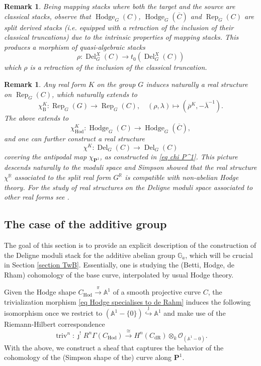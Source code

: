 \documentclass[11pt, a4paper]{amsart}
\numberwithin{equation}{section}
\newtheorem{remark}[theorem]{Remark}
\theoremstyle{definition}
\theoremstyle{remark}
\DeclareMathOperator{\Rep}{Rep}
\DeclareMathOperator{\Hodge}{Hodge}
\DeclareMathOperator{\Deligne}{Del}
\DeclareMathOperator{\triv}{triv}
\DeclareMathOperator{\dR}{dR}
\DeclareMathOperator{\Hod}{Hod}
\DeclareMathOperator{\Del}{Del}
\newcommand{\Oo}{\mathcal{O}}
\newcommand{\B}{\mathrm{B}}
\renewcommand{\P}{\mathbf{P}}
\newcommand{\ol}[1]{\overline{#1}}
\renewcommand{\AA}{\mathbb{A}}
\newcommand{\GG}{\mathbb{G}}
\newcommand{\RR}{\mathbb{R}}
\renewcommand{\to}{\longrightarrow}
\begin{document}
\begin{remark} \label{rm Del is split}
Being mapping stacks where both the target and the source are classical stacks, observe that $\Hodge_{G}(C)$, $\Hodge_{G}(\ol C)$ and $\Rep_{G}(C)$ are split derived stacks ({\emph i.e.} equipped with a retraction of the inclusion of their classical truncations) due to the intrinsic properties of mapping stacks. This produces a morphism of quasi-algebraic stacks 
\[
\rho : \Deligne_{G}^{X}(C) \to t_0 \left ( \Deligne_{G}^{X}(C) \right )
\]
which $\rho$ is a retraction of the inclusion of the classical truncation.
\end{remark}


\begin{remark} \label{rm real form on Deligne}
Any real form $K$ on the group $G$ induces naturally a real structure on $\Rep_G(C)$, which naturally extends to 
\[
\chi^K_{\B} : \Rep_G(G) \to \Rep_G(C), \quad (\rho, \lambda) \mapsto (\ol \rho^K, -\ol\lambda^{-1} ).
\]
The above extends to 
\[
\chi^K_{\Hod} : \Hodge_{G}(C) \to \Hodge_G(\ol C),
\]
and one can further construct a real structure 
\[
\chi^K : \Del_{G}(C) \to \Del_{G}(C)
\]
covering the antipodal map $\chi_{\P^1}$, as constructed in \eqref{eq chi P^1}. This picture descends naturally to the moduli space and Simpson showed \cite{simpson_hodge} that the real structure $\chi^{\RR}$ associated to the split real form $G^\RR$ is compatible with non-abelian Hodge theory. For the study of real structures on the Deligne moduli space associated to other real forms see \cite{biswas&heller&roser}. 
\end{remark}


\subsection{The case of the additive group}

The goal of this section is to provide an explicit description of the construction of the Deligne moduli stack for the additive abelian group $\GG_a$, which will be crucial in Section \ref{section TwB}. Essentially, one is studying the (Betti, Hodge, de Rham) cohomology of the base curve, interpolated by usual Hodge theory.

Given the Hodge shape $C_{\Hod} \stackrel{\pi}{\to} \AA^1$ of a smooth projective curve $C$, the trivialization morphism \eqref{eq Hodge specialises to de Rahm} induces the following isomorphism once we restrict to $(\AA^1 - \{ 0 \}) \stackrel{\jmath}{\hookrightarrow} \AA^1$ and make use of the Riemann-Hilbert correspondence
\[
\triv^n : \jmath^!R^n\Gamma(C_{\Hod}) \stackrel{\cong}{\to} H^n(C_{\dR}) \otimes_k \Oo_{(\AA^1 - 0)}.
\]
With the above, we construct a sheaf that captures the behavior of the cohomology of the (Simpson shape of the) curve along $\P^1$. 
\end{document}
